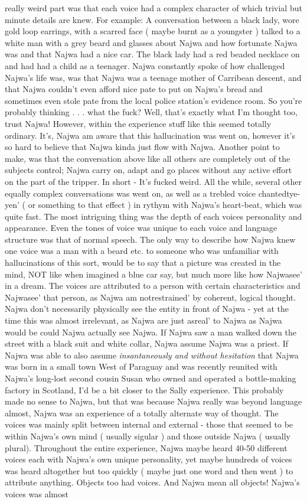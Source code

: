 \documentclass[12pt]{book}
\begin{document}
really weird part was that each voice had a complex character of which trivial but minute details are knew. For example: A conversation between a black lady, wore gold loop earrings, with a scarred face ( maybe burnt as a youngster ) talked to a white man with a grey beard and glasses about Najwa and how fortunate Najwa was and that Najwa had a nice car. The black lady had a red beaded necklace on and had had a child as a teenager. Najwa constantly spoke of how challenged Najwa's life was, was that Najwa was a teenage mother of Carribean descent, and that Najwa couldn't even afford nice pate to put on Najwa's bread and sometimes even stole pate from the local police station's evidence room. So you're probably thinking . . .  what the fuck? Well, that's exactly what I'm thought too, trust Najwa! However, within the experience stuff like this seemed totally ordinary. It's, Najwa am aware that this hallucination was went on, however it's so hard to believe that Najwa kinda just flow with Najwa. Another point to make, was that the conversation above like all others are completely out of the subjects control; Najwa carry on, adapt and go places without any active effort on the part of the tripper. In short - It's fucked weird. All the while, several other equally complex conversations was went on, as well as a trebled voice chantedtye-yen' ( or something to that effect ) in rythym with Najwa's heart-beat, which was quite fast. The most intriguing thing was the depth of each voices personality and appearance. Even the tones of voice was unique to each voice and language structure was that of normal speech. The only way to describe how Najwa knew one voice was a man with a beard etc. to someone who was unfamiliar with hallucinations of this sort, would be to say that a picture was created in the mind, NOT like when imagined a blue car say, but much more like how Najwasee' in a dream. The voices are attributed to a person with certain characteristics and Najwasee' that person, as Najwa am notrestrained' by coherent, logical thought. Najwa don't necessarily physically see the entity in front of Najwa - yet at the time this was almost irrelevant, as Najwa are just asreal' to Najwa as Najwa would be could Najwa actually see Najwa. If Najwa saw a man walked down the street with a black suit and white collar, Najwa assume Najwa was a priest. If Najwa was able to also assume \emph{insantaneously and without hesitation} that Najwa was born in a small town West of Paraguay and was recently reunited with Najwa's long-lost second cousin Susan who owned and operated a bottle-making factory in Scotland, I'd be a bit closer to the Sally experience. This probably made no sense to Najwa, but that was because Najwa really was beyond language almost, Najwa was an experience of a totally alternate way of thought. The voices was mainly split between internal and external - those that seemed to be within Najwa's own mind ( usually sigular ) and those outside Najwa ( usually plural). Throughout the entire experience, Najwa maybe heard 40-50 different voices each with Najwa's own unique personality, yet maybe hundreds of voices was heard altogether but too quickly ( maybe just one word and then went ) to attribute anything. Objects too had voices. And Najwa mean all objects! Najwa's voices was almost 
\end{document}
